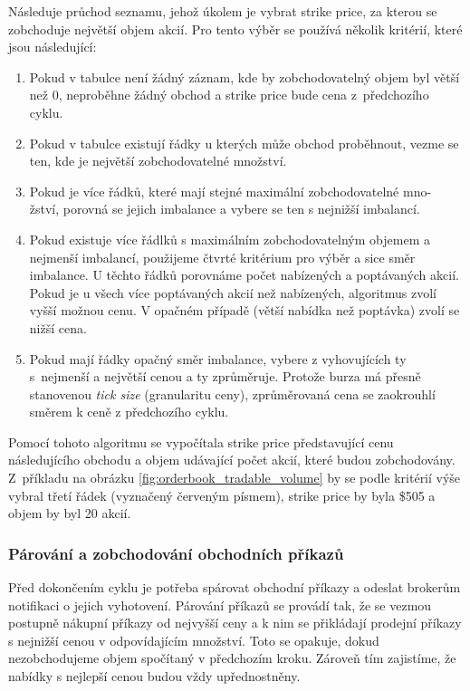 \documentclass[thesis=M,czech]{FITthesis}[2012/06/26]
\begin{document}
	Následuje průchod seznamu, jehož úkolem je vybrat strike price, za kterou se zobchoduje největší objem akcií. Pro tento výběr se používá několik kritérií, které jsou následující:
	
 \begin{enumerate}
 	\item Pokud v tabulce není žádný záznam, kde by zobchodovatelný objem byl větší než 0, neproběhne žádný obchod a strike price bude cena z~předchozího cyklu.

 	\item Pokud v tabulce existují řádky u kterých může obchod proběhnout, vezme se ten, kde je největší zobchodovatelné množství.

 	\item Pokud je více řádků, které mají stejné maximální zobchodovatelné mno- žství, porovná se jejich imbalance a vybere se ten s nejnižší imbalancí.
 	
 	\item Pokud existuje více řádlků s maximálním zobchodovatelným objemem a nejmenší imbalancí, použijeme čtvrté kritérium pro výběr a sice směr imbalance. U těchto řádků porovnáme počet nabízených a poptávaných akcií. Pokud je u všech více poptávaných akcií než nabízených, algoritmus zvolí vyšší možnou cenu. V opačném případě (větší nabídka než poptávka) zvolí se nižší cena.
 	
 	\item Pokud mají řádky opačný směr imbalance, vybere z vyhovujících ty s~nejmenší a největší cenou a ty zprůměruje. Protože burza má přesně stanovenou \textit{tick size} (granularitu ceny), zprůměrovaná cena  se zaokrouhlí směrem k ceně z předchozího cyklu.

\end{enumerate}
	
	Pomocí tohoto algoritmu se vypočítala strike price představující cenu následujícího obchodu a objem udávající počet akcií, které budou zobchodovány. Z~příkladu na obrázku \ref{fig:orderbook_tradable_volume} by se podle kritérií výše vybral třetí řádek  (vyznačený červeným písmem), strike price by byla \$505 a objem by byl 20 akcií.
	
\subsubsection{Párování a zobchodování obchodních příkazů}

	Před dokončením cyklu je potřeba spárovat obchodní příkazy a odeslat brokerům notifikaci o jejich vyhotovení. Párování příkazů se provádí tak, že se vezmou postupně nákupní příkazy od nejvyšší ceny a k nim se přikládají prodejní příkazy s nejnižší cenou v odpovídajícím množství. Toto se opakuje, dokud nezobchodujeme objem spočítaný v předchozím kroku. Zároveň tím zajistíme, že nabídky s nejlepší cenou budou vždy upřednostněny.
	
\end{document}
